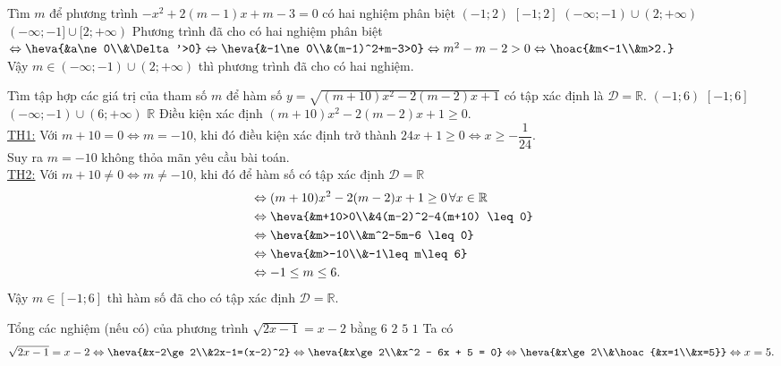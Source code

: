 \begin{ex}%
Tìm $m$ để phương trình $-x^2+2(m-1)x+m-3=0$ có hai nghiệm phân biệt
\choice
{$(-1;2)$}
{$[-1;2]$}
{\True $(-\infty;-1)\cup(2;+\infty)$}
{$(-\infty;-1]\cup[2;+\infty)$}
\loigiai
{Phương trình đã cho có hai nghiệm phân biệt\\
$\Leftrightarrow\heva{&a\ne0\\&\Delta'>0}\Leftrightarrow\heva{&-1\ne 0\\&(m-1)^2+m-3>0}\Leftrightarrow m^2-m-2>0\Leftrightarrow \hoac{&m<-1\\&m>2.}$\\
Vậy $m\in(-\infty;-1)\cup(2;+\infty)$ thì phương trình đã cho có hai nghiệm.
}
\end{ex}

\begin{ex}%
Tìm tập hợp các giá trị của tham số $m$ để hàm số $y = \sqrt{(m+10)x^2-2(m-2)x+1}$ có tập xác định là $\mathscr{D}=\mathbb{R}$.
\choice
{$(-1;6)$}
{$[-1;6]$}
{$(-\infty;-1)\cup (6;+\infty)$}
{$\mathbb{R}$}
\loigiai
{Điều kiện xác định $(m+10)x^2-2(m-2)x+1\geq 0$.\\
\underline{TH1:} Với $m+10 =0 \Leftrightarrow m =-10$, khi đó điều kiện xác định trở thành $24x+1\geq 0\Leftrightarrow x \geq -\dfrac{1}{24}$.\\
Suy ra $m =-10$ không thỏa mãn yêu cầu bài toán.\\
\underline{TH2:} Với $m+10 \ne0 \Leftrightarrow m \ne-10$, khi đó để hàm số có tập xác định $\mathscr{D} =\mathbb{R}$
\begin{align*}
&\Leftrightarrow (m+10)x^2-2(m-2)x+1\geq 0\, \forall x \in \mathbb{R}\\& \Leftrightarrow \heva{&m+10>0\\&4(m-2)^2-4(m+10) \leq 0}\\& \Leftrightarrow \heva{&m>-10\\&m^2-5m-6 \leq 0}\\& \Leftrightarrow \heva{&m>-10\\&-1\leq m\leq 6}\\&\Leftrightarrow -1\leq m\leq 6.
\end{align*}
Vậy $m\in [-1;6]$ thì hàm số đã cho có tập xác định $\mathscr{D}=\mathbb{R}$.
}
\end{ex}

\begin{ex}%
Tổng các nghiệm (nếu có) của phương trình $\sqrt{2x-1} = x-2$ bằng
\choice
{$6$}
{$2$}
{\True $5$}
{$1$}
\loigiai
{
Ta có 
\[\sqrt{2x-1} = x-2 \Leftrightarrow \heva{&x-2\ge 2\\&2x-1=(x-2)^2} \Leftrightarrow \heva{&x\ge 2\\&x^2 - 6x + 5 = 0} \Leftrightarrow \heva{&x\ge 2\\&\hoac{&x=1\\&x=5}} \Leftrightarrow x=5.\]
}
\end{ex}

